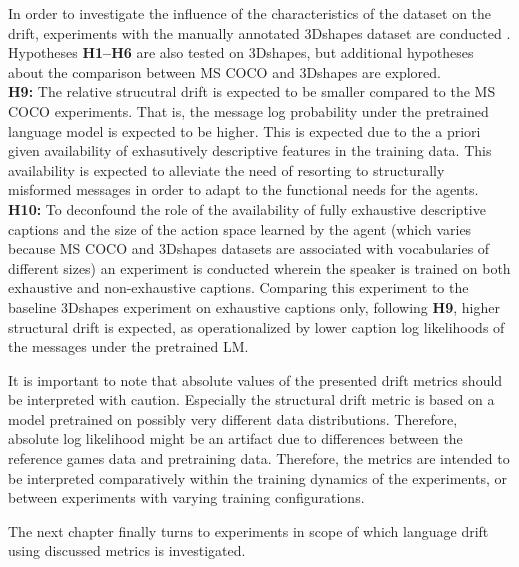 In order to investigate the influence of the characteristics of the dataset on the drift, experiments with the manually annotated 3Dshapes dataset are conducted \parencite{burgess20183d}. Hypotheses \textbf{H1--H6} are also tested on 3Dshapes, but additional hypotheses about the comparison between MS COCO and 3Dshapes are explored. \\
\newline
\textbf{H9:} The relative strucutral drift is expected to be smaller compared to the MS COCO experiments. That is, the message log probability under the pretrained language model is expected to be higher. This is expected due to the a priori given availability of exhasutively descriptive features in the training data. This availability is expected to alleviate the need of resorting to structurally misformed messages in order to adapt to the functional needs for the agents. \newline
\textbf{H10:} To deconfound the role of the availability of fully exhaustive descriptive captions and the size of the action space learned by the agent (which varies because MS COCO and 3Dshapes datasets are associated with vocabularies of different sizes) an experiment is conducted wherein the speaker is trained on both exhaustive and non-exhaustive captions. Comparing this experiment to the baseline 3Dshapes experiment on exhaustive captions only, following \textbf{H9}, higher structural drift is expected, as operationalized by lower caption log likelihoods of the messages under the pretrained LM.\newline

It is important to note that absolute values of the presented drift metrics should be interpreted with caution. Especially the structural drift metric is based on a model pretrained on possibly very different data distributions. Therefore, absolute log likelihood might be an artifact due to differences between the reference games data and pretraining data. Therefore, the metrics are intended to be interpreted comparatively within the training dynamics of the experiments, or between experiments with varying training configurations.

The next chapter finally turns to experiments in scope of which language drift using discussed metrics is investigated. 